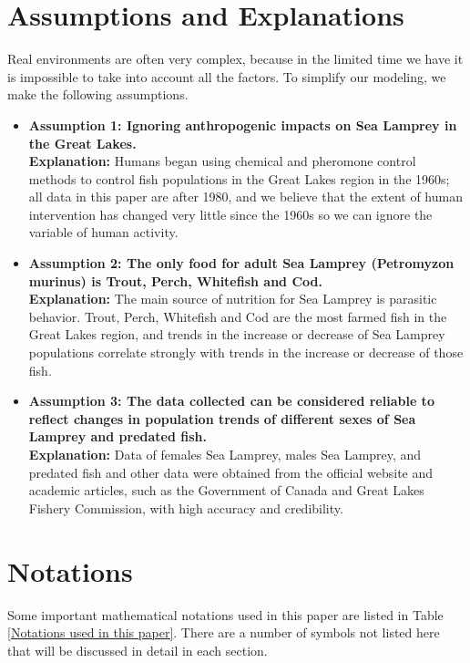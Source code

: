 \documentclass{mcmthesis}
\begin{document}
\section{Assumptions and Explanations}
Real environments are often very complex, because in the limited time we have it is impossible to take into account all the factors.
To simplify our modeling, we make the following assumptions.
\begin{itemize}
  \item \textbf{Assumption 1: Ignoring anthropogenic impacts on Sea Lamprey in the Great Lakes.}\\
        \textbf{Explanation:} Humans began using chemical and pheromone control methods to control fish populations
        in the Great Lakes region in the 1960s\cite{8}; all data in this paper are after 1980,
        and we believe that the extent of human intervention has changed very little
        since the 1960s so we can ignore the variable of human activity.
  \item \textbf{Assumption 2: The only food for adult Sea Lamprey (Petromyzon murinus) is Trout, Perch, Whitefish and Cod.}\\
        \textbf{Explanation:} The main source of nutrition for Sea Lamprey is parasitic behavior.
        Trout, Perch, Whitefish and Cod are the most farmed fish in the Great Lakes region,
        and trends in the increase or decrease of Sea Lamprey populations correlate strongly with trends in the increase or decrease of those fish.
  \item \textbf{Assumption 3: The data collected can be considered reliable to reflect changes in population trends of different sexes of Sea Lamprey and predated fish.}\\
        \textbf{Explanation:} Data of females Sea Lamprey, males Sea Lamprey, and predated fish
        and other data were obtained from the official website and academic articles, such as the Government of Canada and Great Lakes Fishery Commission, with high accuracy and credibility.
\end{itemize}

\section{Notations}
Some important mathematical notations used in this paper are listed in Table \ref{Notations used in this paper}.
There are a number of symbols not listed here that will be discussed in detail in each section.
\end{document}
